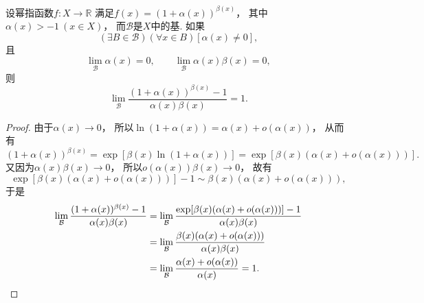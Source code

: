 \begin{proposition}
设幂指函数\(f\colon X\to\mathbb{R}\)
满足\(f(x) = (1+\alpha(x))^{\beta(x)}\)，
其中\(\alpha(x)>-1\ (x \in X)\)，
而\(\mathcal{B}\)是\(X\)中的基.
如果\[
	(\exists B\in\mathcal{B})
	(\forall x \in B)
	[\alpha(x)\neq0],
\]
且\[
	\lim_\mathcal{B} \alpha(x) = 0,
	\qquad
	\lim_\mathcal{B} \alpha(x) \beta(x) = 0,
\]
则\[
	\lim_\mathcal{B} \frac{(1+\alpha(x))^{\beta(x)}-1}{\alpha(x) \beta(x)} = 1.
\]
\begin{proof}
由于\(\alpha(x)\to0\)，
所以\(\ln(1+\alpha(x)) = \alpha(x) + o(\alpha(x))\)，
从而有\[
	(1+\alpha(x))^{\beta(x)}
	= \exp[\beta(x) \ln(1+\alpha(x))]
	= \exp[\beta(x) (\alpha(x) + o(\alpha(x)))].
\]
又因为\(\alpha(x) \beta(x) \to 0\)，
所以\(o(\alpha(x)) \beta(x) \to 0\)，
故有\[
	\exp[\beta(x) (\alpha(x) + o(\alpha(x)))] - 1
	\sim \beta(x) (\alpha(x) + o(\alpha(x))),
\]
于是\begin{align*}
	\lim_\mathcal{B} \frac{(1+\alpha(x))^{\beta(x)}-1}{\alpha(x) \beta(x)}
	&= \lim_\mathcal{B} \frac{\exp[\beta(x) (\alpha(x) + o(\alpha(x)))]-1}{\alpha(x) \beta(x)} \\
	&= \lim_\mathcal{B} \frac{\beta(x) (\alpha(x) + o(\alpha(x)))}{\alpha(x) \beta(x)} \\
	&= \lim_\mathcal{B} \frac{\alpha(x) + o(\alpha(x))}{\alpha(x)}
	= 1.
	\qedhere
\end{align*}
\end{proof}
\end{proposition}
